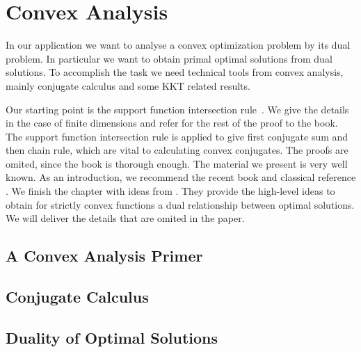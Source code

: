 \documentclass[11pt, a4paper, BCOR=10mm, DIV=11]{scrbook}
\theoremstyle{definition}
\theoremstyle{plain}
\begin{document}
\chapter{Convex Analysis}
In our application we want to analyse a convex optimization problem by its dual problem.
In particular we want to obtain primal optimal solutions from dual solutions.
To accomplish the task we need technical tools from convex analysis, 
mainly conjugate calculus and some KKT related results.

Our starting point is 
the support function intersection rule~\cite[Theorem 4.23]{Mordukhovich2022}.
We give the details in the case of finite dimensions and refer for the rest of the proof to the book.
The support function intersection rule is applied to give first conjugate sum and then chain rule,
which are vital to calculating convex conjugates. The proofs are omited, since the book is thorough enough. 
The material we present is very well known.
As an introduction, we recommend the recent book \cite{Mordukhovich2022} and classical reference \cite{Rockafellar1970}.
We finish the chapter with ideas from \cite{Tseng1991}. 
They provide the high-level ideas to obtain for strictly convex
functions a dual relationship between optimal solutions.
We will deliver the details that are omited in the paper.
  \section{A Convex Analysis Primer}
  
  \section{Conjugate Calculus}
  
%
  \newpage
  \section{Duality of Optimal Solutions}
  
\end{document}
